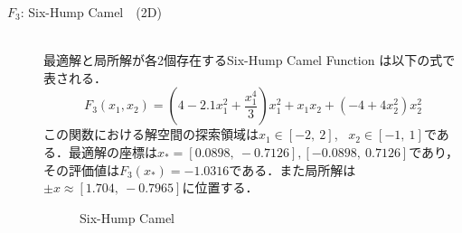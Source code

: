 \documentclass[a4j,11pt]{jarticle}
\begin{document}
\begin{description}
\item[$F_3$: Six-Hump Camel　(2D)]\mbox{}\\
最適解と局所解が各2個存在するSix-Hump Camel Function \cite{MOP} は以下の式で表される．
\begin{equation}
\label{eq:minF3}
F_3(x_1,x_2)=(4-2.1x_1^2+ \frac{x_1^4}{3})x_1^2+x_1x_2+(-4+4x_2^2)x_2^2
\end{equation}
この関数における解空間の探索領域は$x_1 \in [-2, \ 2]$, \ $x_2 \in [-1, \ 1]$である．最適解の座標は$x_*=[0.0898, \ -0.7126], [-0.0898, \ 0.7126]$であり，その評価値は$F_3(x_*)=-1.0316$である．また局所解は$\pm x \approx [1.704, \ -0.7965]$に位置する．
\begin{figure}[t]
\centering
{}
\caption{Six-Hump Camel}
\label{fig:minF3}
\end{figure}


\end{description}
\end{document}
